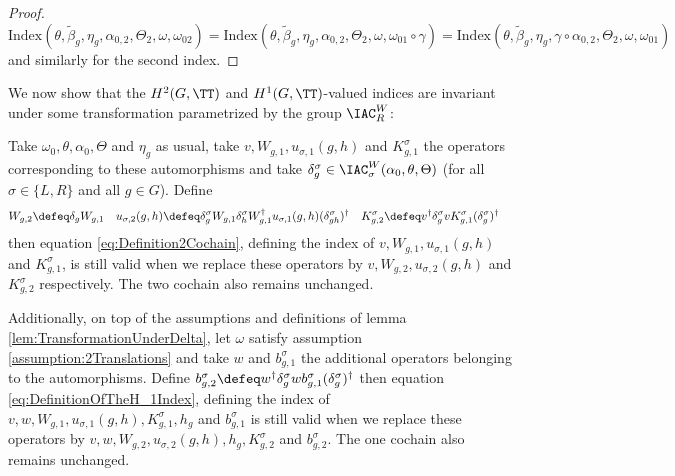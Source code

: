 \begin{proof}
	\begin{equation}
		\textrm{Index}(\theta,\tilde{\beta}_g,\eta_g,\alpha_{0,2},\Theta_2,\omega,\omega_{02})=\textrm{Index}(\theta,\tilde{\beta}_g,\eta_g,\alpha_{0,2},\Theta_2,\omega,\omega_{01}\circ\gamma)=\textrm{Index}(\theta,\tilde{\beta}_g,\eta_g,\gamma\circ\alpha_{0,2},\Theta_2,\omega,\omega_{01})
	\end{equation}
	and similarly for the second index.
\end{proof}
We now show that the $H^2(G,\TT)$ and $H^1(G,\TT)$-valued indices are invariant under some transformation parametrized by the group $\IAC_R^W$:
\begin{lemma}\label{lem:TransformationUnderDelta}
	Take $\omega_0,\theta,\alpha_0,\Theta$ and $\eta_g$ as usual, take $v,W_{g,1},u_{\sigma,1}(g,h)$ and $K_{g,1}^\sigma$ the operators corresponding to these automorphisms and take $\delta^\sigma_g\in\IAC_\sigma^W(\alpha_0,\theta,\Theta)$ (for all $\sigma\in\{L,R\}$ and all $g\in G$). Define
	\begin{align}
		W_{g,2}&\defeq\delta_g W_{g,1}&
		u_{\sigma,2}(g,h)&\defeq \delta_g^\sigma W_{g,1}\delta_h^\sigma W_{g,1}^\dagger u_{\sigma,1}(g,h)(\delta_{gh}^\sigma)^\dagger&
		K^\sigma_{g,2}&\defeq v^\dagger \delta_g^\sigma v K_{g,1}^\sigma (\delta_g^\sigma)^\dagger
	\end{align}
	then equation \eqref{eq:Definition2Cochain}, defining the index of $v,W_{g,1},u_{\sigma,1}(g,h)$ and $K_{g,1}^\sigma$, is still valid when we replace these operators by $v,W_{g,2},u_{\sigma,2}(g,h)$ and $K_{g,2}^\sigma$ respectively. The two cochain also remains unchanged.
\end{lemma}
\begin{lemma}\label{lem:TransformationUnderDeltaTwoTranslations}
	Additionally, on top of the assumptions and definitions of lemma \ref{lem:TransformationUnderDelta}, let $\omega$ satisfy assumption \ref{assumption:2Translations} and take $w$ and $b_{g,1}^\sigma$ the additional operators belonging to the automorphisms. Define $b_{g,2}^\sigma\defeq w^\dagger\delta^\sigma_g w b_{g,1}^\sigma (\delta^\sigma_g)^\dagger$ then equation \ref{eq:DefinitionOfTheH_1Index}, defining the index of $v,w,W_{g,1},u_{\sigma,1}(g,h),K_{g,1}^\sigma,h_g$ and $b_{g,1}^\sigma$ is still valid when we replace these operators by $v,w,W_{g,2},u_{\sigma,2}(g,h),h_g,K_{g,2}^\sigma$ and $b_{g,2}^\sigma$. The one cochain also remains unchanged.
\end{lemma}
